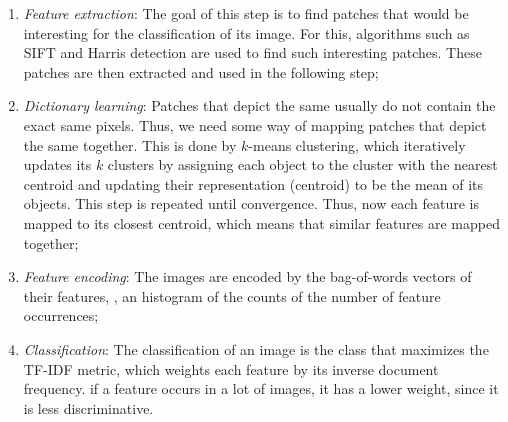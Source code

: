 \begin{enumerate}
  \item \textit{Feature extraction}: The goal of this step is to find patches
    that would be interesting for the classification of its image. For this,
    algorithms such as SIFT and Harris detection are used to find such
    interesting patches. These patches are then extracted and used in the
    following step;
  \item \textit{Dictionary learning}: Patches that depict the same usually do
    not contain the exact same pixels. Thus, we need some way of mapping
    patches that depict the same together. This is done by $k$-means
    clustering, which iteratively updates its $k$ clusters by assigning each
    object to the cluster with the nearest centroid and updating their
    representation (centroid) to be the mean of its objects. This step is
    repeated until convergence. Thus, now each feature is mapped to its closest
    centroid, which means that similar features are mapped together;
  \item \textit{Feature encoding}: The images are encoded by the bag-of-words
    vectors of their features, \ie, an histogram of the counts of the number of
    feature occurrences;
  \item \textit{Classification}: The classification of an image is the class
    that maximizes the TF-IDF metric, which weights each feature by its
    inverse document frequency. \Ie if a feature occurs in a lot of images, it
    has a lower weight, since it is less discriminative.
\end{enumerate}

